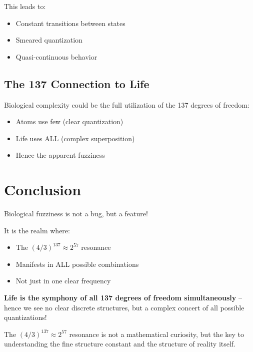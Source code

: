 \documentclass[12pt,a4paper]{article}
\begin{document}
	This leads to:
	\begin{itemize}
		\item Constant transitions between states
		\item Smeared quantization
		\item Quasi-continuous behavior
	\end{itemize}
	
	\subsection{The 137 Connection to Life}
	
	Biological complexity could be the full utilization of the 137 degrees of freedom:
	\begin{itemize}
		\item Atoms use few (clear quantization)
		\item Life uses ALL (complex superposition)
		\item Hence the apparent fuzziness
	\end{itemize}
	
	\section{Conclusion}
	
	Biological fuzziness is not a bug, but a feature! 
	
	It is the realm where:
	\begin{itemize}
		\item The $(4/3)^{137} \approx 2^{57}$ resonance
		\item Manifests in ALL possible combinations
		\item Not just in one clear frequency
	\end{itemize}
	
	\textbf{Life is the symphony of all 137 degrees of freedom simultaneously} -- hence we see no clear discrete structures, but a complex concert of all possible quantizations!
	
	The $(4/3)^{137} \approx 2^{57}$ resonance is not a mathematical curiosity, but the key to understanding the fine structure constant and the structure of reality itself.
	
\end{document}
